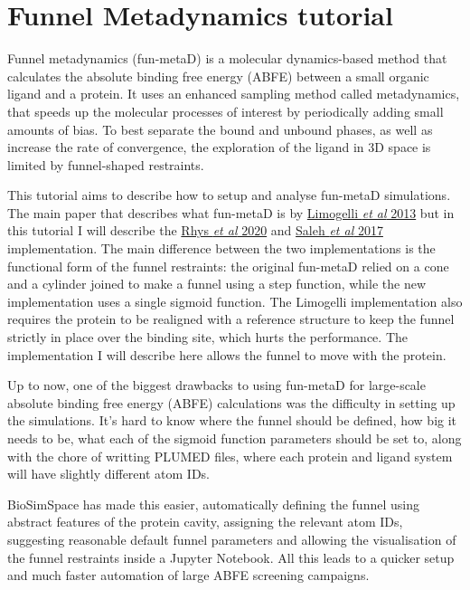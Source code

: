 \hypertarget{funnel-metadynamics-tutorial}{%
\section{Funnel Metadynamics
tutorial}\label{funnel-metadynamics-tutorial}}

Funnel metadynamics (fun-metaD) is a molecular dynamics-based method
that calculates the absolute binding free energy (ABFE) between a small
organic ligand and a protein. It uses an enhanced sampling method called
metadynamics, that speeds up the molecular processes of interest by
periodically adding small amounts of bias. To best separate the bound
and unbound phases, as well as increase the rate of convergence, the
exploration of the ligand in 3D space is limited by funnel-shaped
restraints.

This tutorial aims to describe how to setup and analyse fun-metaD
simulations. The main paper that describes what fun-metaD is by
\href{https://www.pnas.org/content/110/16/6358}{Limogelli \emph{et al}
2013} but in this tutorial I will describe the
\href{https://www.ncbi.nlm.nih.gov/pmc/articles/PMC7467642/}{Rhys
\emph{et al} 2020} and
\href{https://pubs.acs.org/doi/10.1021/acs.jcim.6b00772}{Saleh \emph{et
al} 2017} implementation. The main difference between the two
implementations is the functional form of the funnel restraints: the
original fun-metaD relied on a cone and a cylinder joined to make a
funnel using a step function, while the new implementation uses a single
sigmoid function. The Limogelli implementation also requires the protein
to be realigned with a reference structure to keep the funnel strictly
in place over the binding site, which hurts the performance. The
implementation I will describe here allows the funnel to move with the
protein.

Up to now, one of the biggest drawbacks to using fun-metaD for
large-scale absolute binding free energy (ABFE) calculations was the
difficulty in setting up the simulations. It's hard to know where the
funnel should be defined, how big it needs to be, what each of the
sigmoid function parameters should be set to, along with the chore of
writting PLUMED files, where each protein and ligand system will have
slightly different atom IDs.

BioSimSpace has made this easier, automatically defining the funnel
using abstract features of the protein cavity, assigning the relevant
atom IDs, suggesting reasonable default funnel parameters and allowing
the visualisation of the funnel restraints inside a Jupyter Notebook.
All this leads to a quicker setup and much faster automation of large
ABFE screening campaigns.

